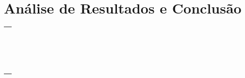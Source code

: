 
\section{Análise de Resultados e Conclusão}

\begin{table}[!hbtp]
\begin{tabularx}{\textwidth}{X}
\hline \\ \hline \\ \hline \\ \hline \\ \hline \\ \hline \\ \hline \\ \hline \\ \hline \\ \hline \\
\hline \\ \hline \\ \hline \\ \hline \\ \hline \\ \hline \\ \hline \\
\end{tabularx}
\end{table}

